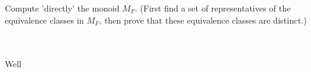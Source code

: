 Compute 'directly' the monoid $M_F$. (First find a set of representatives of the equivalence classes in
$M_F$, then prove that these equivalence classes are distinct.)\\\\

\begin{solution}\renewcommand{\qedsymbol}{}\ \\
    Well
\end{solution}